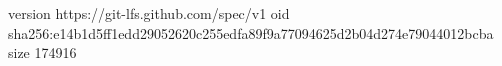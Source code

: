 version https://git-lfs.github.com/spec/v1
oid sha256:e14b1d5ff1edd29052620c255edfa89f9a77094625d2b04d274e79044012bcba
size 174916
